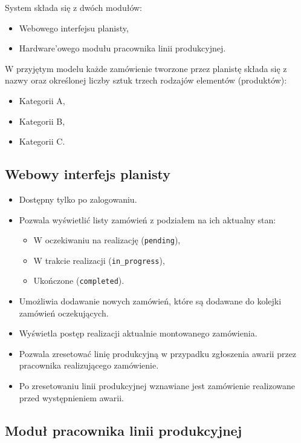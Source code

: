 \documentclass{article}
\begin{document}
System składa się z dwóch modułów:

\begin{itemize}
    \item Webowego interfejsu planisty,
    \item Hardware'owego modułu pracownika linii produkcyjnej.
\end{itemize}

W przyjętym modelu każde zamówienie tworzone przez planistę składa się z nazwy oraz określonej liczby sztuk trzech rodzajów elementów (produktów):

\begin{itemize}
    \item Kategorii A,
    \item Kategorii B,
    \item Kategorii C.
\end{itemize}

\subsection{Webowy interfejs planisty}

\begin{itemize}
    \item Dostępny tylko po zalogowaniu.
    \item Pozwala wyświetlić listy zamówień z podziałem na ich aktualny stan:
    \begin{itemize}
        \item W oczekiwaniu na realizację (\texttt{pending}),
        \item W trakcie realizacji (\texttt{in\_progress}),
        \item Ukończone (\texttt{completed}).
    \end{itemize}
    \item Umożliwia dodawanie nowych zamówień, które są dodawane do kolejki zamówień oczekujących.
    \item Wyświetla postęp realizacji aktualnie montowanego zamówienia.
    \item Pozwala zresetować linię produkcyjną w przypadku zgłoszenia awarii przez pracownika realizującego zamówienie.
    \item Po zresetowaniu linii produkcyjnej wznawiane jest zamówienie realizowane przed występnieniem awarii.
\end{itemize}

\subsection{Moduł pracownika linii produkcyjnej}
\end{document}
